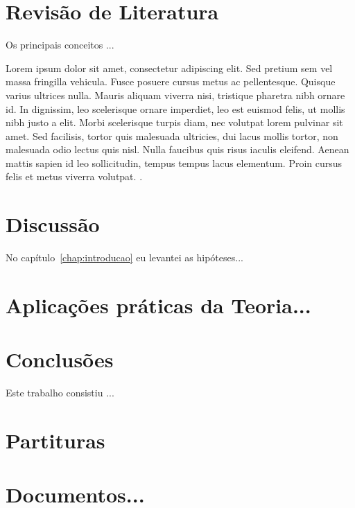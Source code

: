 \chapter{Revisão de Literatura}
\label{chap:revisao-literatura}

Os principais conceitos ...

Lorem ipsum dolor sit amet, consectetur adipiscing elit. Sed pretium
sem vel massa fringilla vehicula. Fusce posuere cursus metus ac
pellentesque. Quisque varius ultrices nulla. Mauris aliquam viverra
nisi, tristique pharetra nibh ornare id. In dignissim, leo scelerisque
ornare imperdiet, leo est euismod felis, ut mollis nibh justo a elit.
Morbi scelerisque turpis diam, nec volutpat lorem pulvinar sit amet.
Sed facilisis, tortor quis malesuada ultricies, dui lacus mollis
tortor, non malesuada odio lectus quis nisl. Nulla faucibus quis risus
iaculis eleifend. Aenean mattis sapien id leo sollicitudin, tempus
tempus lacus elementum. Proin cursus felis et metus viverra volutpat.
\cite{Sampaio2012b}.


\chapter{Discussão}
\label{chap:discussao}

No capítulo~\ref{chap:introducao} eu levantei as hipóteses...


\chapter{Aplicações práticas da Teoria...}
\label{chap:aplicacao}


\chapter{Conclusões}
\label{chap:conclusoes}

Este trabalho consistiu ...

\appendix
\chapter{Partituras}
\label{chap:partituras}


\chapter{Documentos...}
\label{cha:documentos}

\singlespacing



